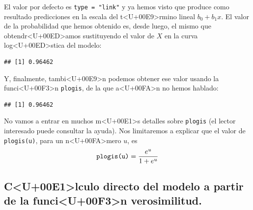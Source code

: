 \documentclass[10pt,a4paper]{article}
\begin{document}
El valor por defecto es \verb#type = "link"#  y ya hemos visto que produce como resultado predicciones en la escala del t<U+00E9>rmino lineal $b_0 + b_1 x$. El valor de la probabilidad que hemos obtenido es, desde luego, el mismo que obtendr<U+00ED>amos sustituyendo el valor de $X$ en la curva log<U+00ED>stica del modelo:

\begin{knitrout}
\color{fgcolor}\begin{kframe}
\begin{alltt}
 \hlopt{+}  \hlopt{*}  \hlopt{/} \hlstd{(} \hlopt{+}  \hlopt{+}  \hlopt{*} 
\end{alltt}
\begin{verbatim}
## [1] 0.96462
\end{verbatim}
\end{kframe}
\end{knitrout}

Y, finalmente, tambi<U+00E9>n podemos obtener ese valor usando la funci<U+00F3>n {\tt plogis}, de la que a<U+00FA>n no hemos hablado:

\begin{knitrout}
\color{fgcolor}\begin{kframe}
\begin{alltt}
 \hlopt{+}  \hlopt{*} 
\end{alltt}
\begin{verbatim}
## [1] 0.96462
\end{verbatim}
\end{kframe}
\end{knitrout}
No vamos a entrar en muchos m<U+00E1>s detalles sobre {\tt plogis} (el lector interesado puede consultar la ayuda). Nos limitaremos a explicar que el valor de {\tt plogis(u)}, para un n<U+00FA>mero $u$, es
\[\mbox{\tt plogis(u)} = \dfrac{e^u}{1 + e^u}\]


\subsection{C<U+00E1>lculo directo del modelo a partir de la funci<U+00F3>n verosimilitud.}
\label{tut13:subsec:calculoDirectoFuncionVerosimilitud}
\\
\end{document}

